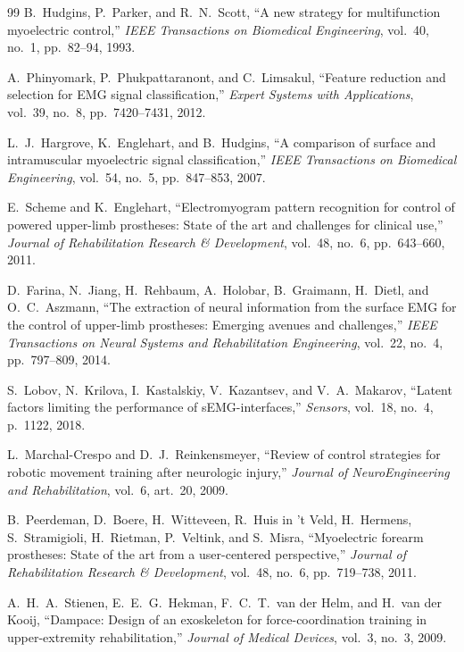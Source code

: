 \documentclass[11pt,a4paper]{article}
\begin{document}
\begin{thebibliography}{99}
B.~Hudgins, P.~Parker, and R.~N.~Scott, ``A new strategy for multifunction myoelectric control,'' \textit{IEEE Transactions on Biomedical Engineering}, vol.~40, no.~1, pp.~82--94, 1993.

A.~Phinyomark, P.~Phukpattaranont, and C.~Limsakul, ``Feature reduction and selection for EMG signal classification,'' \textit{Expert Systems with Applications}, vol.~39, no.~8, pp.~7420--7431, 2012.

L.~J.~Hargrove, K.~Englehart, and B.~Hudgins, ``A comparison of surface and intramuscular myoelectric signal classification,'' \textit{IEEE Transactions on Biomedical Engineering}, vol.~54, no.~5, pp.~847--853, 2007.

E.~Scheme and K.~Englehart, ``Electromyogram pattern recognition for control of powered upper-limb prostheses: State of the art and challenges for clinical use,'' \textit{Journal of Rehabilitation Research \& Development}, vol.~48, no.~6, pp.~643--660, 2011.

D.~Farina, N.~Jiang, H.~Rehbaum, A.~Holobar, B.~Graimann, H.~Dietl, and O.~C.~Aszmann, ``The extraction of neural information from the surface EMG for the control of upper-limb prostheses: Emerging avenues and challenges,'' \textit{IEEE Transactions on Neural Systems and Rehabilitation Engineering}, vol.~22, no.~4, pp.~797--809, 2014.

S.~Lobov, N.~Krilova, I.~Kastalskiy, V.~Kazantsev, and V.~A.~Makarov, ``Latent factors limiting the performance of sEMG-interfaces,'' \textit{Sensors}, vol.~18, no.~4, p.~1122, 2018.

L.~Marchal-Crespo and D.~J.~Reinkensmeyer, ``Review of control strategies for robotic movement training after neurologic injury,'' \textit{Journal of NeuroEngineering and Rehabilitation}, vol.~6, art.~20, 2009.

B.~Peerdeman, D.~Boere, H.~Witteveen, R.~Huis in 't Veld, H.~Hermens, S.~Stramigioli, H.~Rietman, P.~Veltink, and S.~Misra, ``Myoelectric forearm prostheses: State of the art from a user-centered perspective,'' \textit{Journal of Rehabilitation Research \& Development}, vol.~48, no.~6, pp.~719--738, 2011.

A.~H.~A.~Stienen, E.~E.~G.~Hekman, F.~C.~T.~van der Helm, and H.~van der Kooij, ``Dampace: Design of an exoskeleton for force-coordination training in upper-extremity rehabilitation,'' \textit{Journal of Medical Devices}, vol.~3, no.~3, 2009.


\end{thebibliography}
\end{document}
